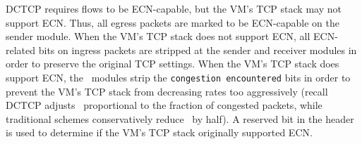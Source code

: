 DCTCP requires flows to be ECN-capable, but the VM's TCP stack may not support ECN.
Thus, all egress packets are marked to be ECN-capable on the sender module. 
When the VM's TCP stack does not support ECN, all ECN-related bits on ingress packets are stripped at the sender
and receiver modules in order to preserve the original TCP settings. When the VM's TCP
stack does support ECN, the~\acdc{} modules strip the {\tt congestion encountered} 
bits in order to prevent the VM's TCP stack from decreasing rates too aggressively
(recall DCTCP adjusts~\cwnd{} proportional to the fraction of congested packets, while traditional schemes conservatively reduce~\cwnd{} by half). A reserved bit in
the header is used to determine if the VM's TCP stack originally 
supported ECN.
%
%
%

